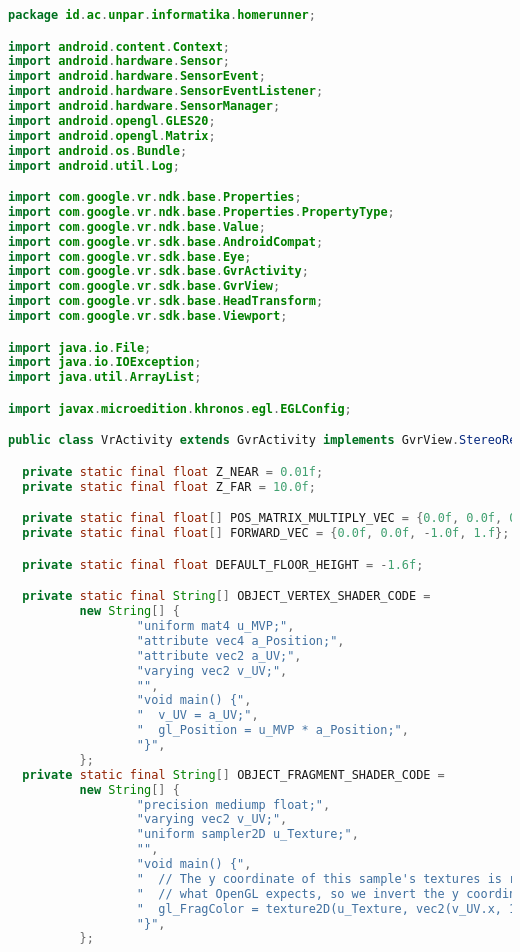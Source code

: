 \begin{lstlisting}[language=Java,caption=VrActivity.java]
package id.ac.unpar.informatika.homerunner;

import android.content.Context;
import android.hardware.Sensor;
import android.hardware.SensorEvent;
import android.hardware.SensorEventListener;
import android.hardware.SensorManager;
import android.opengl.GLES20;
import android.opengl.Matrix;
import android.os.Bundle;
import android.util.Log;

import com.google.vr.ndk.base.Properties;
import com.google.vr.ndk.base.Properties.PropertyType;
import com.google.vr.ndk.base.Value;
import com.google.vr.sdk.base.AndroidCompat;
import com.google.vr.sdk.base.Eye;
import com.google.vr.sdk.base.GvrActivity;
import com.google.vr.sdk.base.GvrView;
import com.google.vr.sdk.base.HeadTransform;
import com.google.vr.sdk.base.Viewport;

import java.io.File;
import java.io.IOException;
import java.util.ArrayList;

import javax.microedition.khronos.egl.EGLConfig;

public class VrActivity extends GvrActivity implements GvrView.StereoRenderer, SensorEventListener {

  private static final float Z_NEAR = 0.01f;
  private static final float Z_FAR = 10.0f;

  private static final float[] POS_MATRIX_MULTIPLY_VEC = {0.0f, 0.0f, 0.0f, 1.0f};
  private static final float[] FORWARD_VEC = {0.0f, 0.0f, -1.0f, 1.f};

  private static final float DEFAULT_FLOOR_HEIGHT = -1.6f;

  private static final String[] OBJECT_VERTEX_SHADER_CODE =
          new String[] {
                  "uniform mat4 u_MVP;",
                  "attribute vec4 a_Position;",
                  "attribute vec2 a_UV;",
                  "varying vec2 v_UV;",
                  "",
                  "void main() {",
                  "  v_UV = a_UV;",
                  "  gl_Position = u_MVP * a_Position;",
                  "}",
          };
  private static final String[] OBJECT_FRAGMENT_SHADER_CODE =
          new String[] {
                  "precision mediump float;",
                  "varying vec2 v_UV;",
                  "uniform sampler2D u_Texture;",
                  "",
                  "void main() {",
                  "  // The y coordinate of this sample's textures is reversed compared to",
                  "  // what OpenGL expects, so we invert the y coordinate.",
                  "  gl_FragColor = texture2D(u_Texture, vec2(v_UV.x, 1.0 - v_UV.y));",
                  "}",
          };


\end{lstlisting}
